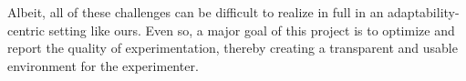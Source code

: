 \documentclass[letterpaper,twocolumn,12pt]{article}
\begin{document}
Albeit, all of these challenges can be difficult to realize in full in an adaptability-centric setting like ours. Even so, a major goal of this project is to optimize and report the quality of experimentation, thereby creating a transparent and usable environment for the experimenter. 




\end{document}
